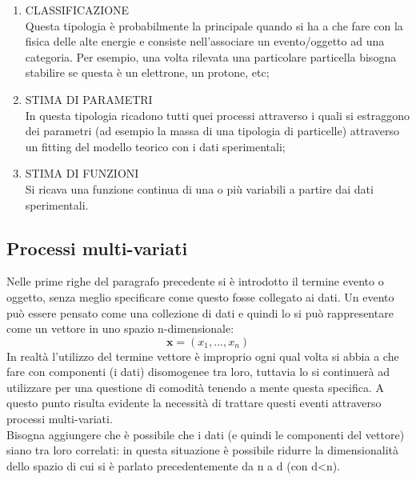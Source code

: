 	\begin{enumerate}
		\item CLASSIFICAZIONE \\
			Questa tipologia è probabilmente la principale quando si ha a che fare con la fisica delle alte energie e consiste nell'associare un evento/oggetto  ad una categoria. Per esempio, una volta rilevata una particolare particella bisogna stabilire se questa è un elettrone, un protone, etc;
		\item STIMA DI PARAMETRI \\
			In questa tipologia ricadono tutti quei processi attraverso i quali si estraggono dei parametri (ad esempio la massa di una tipologia di particelle) attraverso un fitting del modello teorico con i dati sperimentali;
		\item STIMA DI FUNZIONI \\
			Si ricava una funzione continua di una o più variabili a partire dai dati sperimentali.
	\end{enumerate}

\subsection{Processi multi-variati}
\label{subsec:processi multi-variati}

	Nelle prime righe del paragrafo precedente si è introdotto il termine evento o oggetto, senza meglio specificare come questo fosse collegato ai dati. Un evento può essere pensato come una collezione di dati e quindi lo si può rappresentare come un vettore in uno spazio n-dimensionale: 
	\begin{equation}
		\textbf{x} = (x_{1},...,x_{n})
	\end{equation}
	In realtà l'utilizzo del termine vettore è improprio ogni qual volta si abbia a che fare con componenti (i dati) disomogenee tra loro, tuttavia lo si continuerà ad utilizzare per una questione di comodità tenendo a mente questa specifica. A questo punto risulta evidente la necessità di trattare questi eventi attraverso processi multi-variati.\\
	Bisogna aggiungere che è possibile che i dati (e quindi le componenti del vettore) siano tra loro correlati: in questa situazione è possibile ridurre la dimensionalità dello spazio di cui si è parlato precedentemente da n a d (con d<n).
	
\newpage
	
